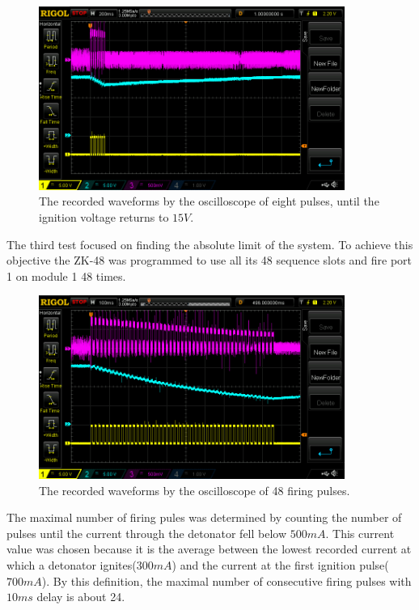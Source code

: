 \begin{figure}[!ht]
    \centering
    \includegraphics[width=10cm]{./Figures/eight_pulses_wide.png}
    \caption{The recorded waveforms by the oscilloscope of eight pulses, until the ignition voltage returns to $15V$.}
    \label{fig:eight_pulses_wide}     
\end{figure}

\noindent The third test focused on finding the absolute limit of the system. To achieve this objective the ZK-48 was programmed to use all its 48 sequence slots and fire port 1 on module 1 48 times. 

\begin{figure}[!ht]
    \centering
    \includegraphics[width=10cm]{./Figures/max_pulses.png}
    \caption{The recorded waveforms by the oscilloscope of 48 firing pulses.}
    \label{fig:max_pulses}     
\end{figure}

\noindent The maximal number of firing pules was determined by counting the number of pulses until the current through the detonator fell below $500mA$. This current value was chosen because it is the average between the lowest recorded current at which a detonator ignites($300mA$) and the current at the first ignition pulse($700mA$). By this definition, the maximal number of consecutive firing pulses with $10ms$ delay is about 24.

